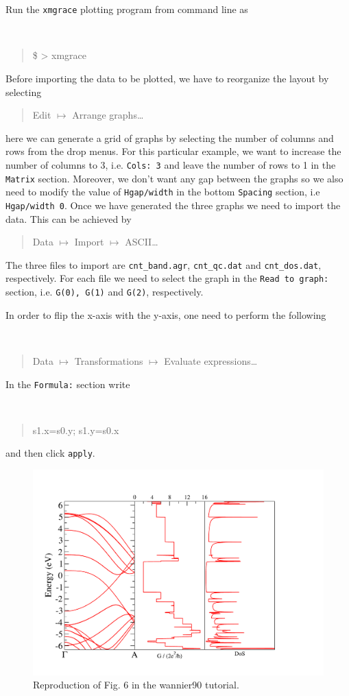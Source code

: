 \begin{tcolorbox}[colback=blue!5!white,title=XMGRACE TUTORIAL] 
Run the {\tt xmgrace} plotting program from command line as 

{\tt 
\begin{quote}
\$ > xmgrace
\end{quote}
}

Before importing the data to be plotted, we have to reorganize the layout by selecting

{\tt

\begin{quote}

Edit $\mapsto$ Arrange graphs\dots

\end{quote}
}
here we can generate a grid of graphs by selecting the number of columns and rows from the drop menus. For this particular example, we want to increase the number of columns to 3, i.e. {\tt Cols: 3} and leave the number of rows to 1 in the {\tt Matrix} section. Moreover, we don't want any gap between the graphs so we also need to modify the value of {\tt Hgap/width} in the bottom {\tt Spacing} section, i.e {\tt Hgap/width 0}. Once we have generated the three graphs we need to import the data. This can be achieved by 
{\tt \begin{quote}
Data $\mapsto$ Import $\mapsto$ ASCII\dots
\end{quote}}

The three files to import are {\tt cnt\_band.agr}, {\tt cnt\_qc.dat} and {\tt cnt\_dos.dat}, respectively. For each file we need to select the graph in the {\tt Read to graph:} section, i.e. {\tt G(0), G(1)} and {\tt G(2)}, respectively.

In order to flip the x-axis with the y-axis, one need to perform the following
{\tt
\begin{quote}
Data $\mapsto$ Transformations $\mapsto$ Evaluate expressions\dots
\end{quote}	
}
In the {\tt Formula:} section write
{\tt
\begin{quote}
s1.x=s0.y; s1.y=s0.x
\end{quote}}
and then click {\tt apply}.
\end{tcolorbox}



\begin{figure}[b!]
\centering
\includegraphics[width=0.7\columnwidth]{figure/example13/cnt55_band.pdf}
\caption{Reproduction of Fig. 6 in the {\sc wannier90} tutorial.}\label{fig13.1}
\end{figure}
